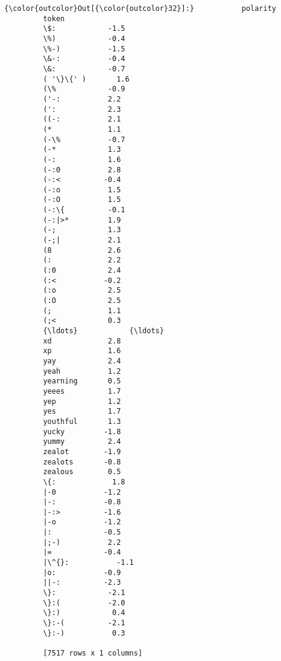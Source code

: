 \documentclass[11pt]{article}
\begin{document}
\begin{Verbatim}[commandchars=\\\{\}]
{\color{outcolor}Out[{\color{outcolor}32}]:}           polarity
         token             
         \$:            -1.5
         \%)            -0.4
         \%-)           -1.5
         \&-:           -0.4
         \&:            -0.7
         ( '\}\{' )       1.6
         (\%            -0.9
         ('-:           2.2
         (':            2.3
         ((-:           2.1
         (*             1.1
         (-\%           -0.7
         (-*            1.3
         (-:            1.6
         (-:0           2.8
         (-:<          -0.4
         (-:o           1.5
         (-:O           1.5
         (-:\{          -0.1
         (-:|>*         1.9
         (-;            1.3
         (-;|           2.1
         (8             2.6
         (:             2.2
         (:0            2.4
         (:<           -0.2
         (:o            2.5
         (:O            2.5
         (;             1.1
         (;<            0.3
         {\ldots}            {\ldots}
         xd             2.8
         xp             1.6
         yay            2.4
         yeah           1.2
         yearning       0.5
         yeees          1.7
         yep            1.2
         yes            1.7
         youthful       1.3
         yucky         -1.8
         yummy          2.4
         zealot        -1.9
         zealots       -0.8
         zealous        0.5
         \{:             1.8
         |-0           -1.2
         |-:           -0.8
         |-:>          -1.6
         |-o           -1.2
         |:            -0.5
         |;-)           2.2
         |=            -0.4
         |\^{}:           -1.1
         |o:           -0.9
         ||-:          -2.3
         \}:            -2.1
         \}:(           -2.0
         \}:)            0.4
         \}:-(          -2.1
         \}:-)           0.3
         
         [7517 rows x 1 columns]
\end{Verbatim}
            
\end{document}
